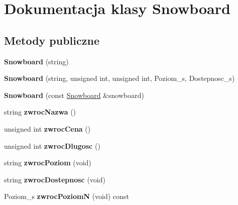 \hypertarget{class_snowboard}{}\section{Dokumentacja klasy Snowboard}
\label{class_snowboard}
\subsection*{Metody publiczne}
\begin{DoxyCompactItemize}
\item 
\mbox{\label{class_snowboard_aeede8444cd911d37088be24d03113ae9}} 
{\bfseries Snowboard} (string)
\item 
\mbox{\label{class_snowboard_a6d4fae152cd7428a443d101605eaa24a}} 
{\bfseries Snowboard} (string, unsigned int, unsigned int, Poziom\+\_\+s, Dostepnosc\+\_\+s)
\item 
\mbox{\label{class_snowboard_adb570913caa563993262d3370a2750eb}} 
{\bfseries Snowboard} (const \hyperlink{class_snowboard}{Snowboard} \&snowboard)
\item 
\mbox{\label{class_snowboard_abfcf3dd0c6af65f187f5e6bf0dea9c0d}} 
string {\bfseries zwroc\+Nazwa} ()
\item 
\mbox{\label{class_snowboard_aa402c2e023feffd7f5ae0d1e2c039d3e}} 
unsigned int {\bfseries zwroc\+Cena} ()
\item 
\mbox{\label{class_snowboard_a169ebefeb57f45826056b0850e3b8701}} 
unsigned int {\bfseries zwroc\+Dlugosc} ()
\item 
\mbox{\label{class_snowboard_adbe3f6f995981479d7aed1b23f5b4357}} 
string {\bfseries zwroc\+Poziom} (void)
\item 
\mbox{\label{class_snowboard_a393b5795787fecd229e683fee5ffc5e4}} 
string {\bfseries zwroc\+Dostepnosc} (void)
\item 
\mbox{\label{class_snowboard_a42e01d1ddae44085d414490e110ed945}} 
Poziom\+\_\+s {\bfseries zwroc\+PoziomN} (void) const
\item 

\end{DoxyCompactItemize}

